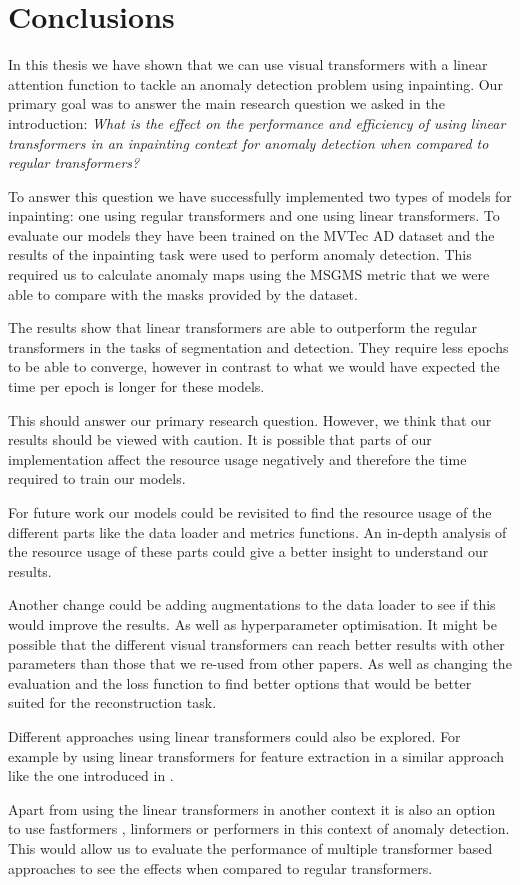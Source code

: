 \chapter{Conclusions}\label{ch:conclusions}

In this thesis we have shown that we can use visual transformers with a linear attention function to tackle an anomaly detection problem using inpainting. Our primary goal was to answer the main research question we asked in the introduction: \textsl{What is the effect on the performance and efficiency of using linear transformers in an inpainting context for anomaly detection when compared to regular transformers?}

To answer this question we have successfully implemented two types of models for inpainting: one using regular transformers and one using linear transformers. To evaluate our models they have been trained on the MVTec AD dataset and the results of the inpainting task were used to perform anomaly detection. This required us to calculate anomaly maps using the MSGMS metric that we were able to compare with the masks provided by the dataset.

The results show that linear transformers are able to outperform the regular transformers in the tasks of segmentation and detection. They require less epochs to be able to converge, however in contrast to what we would have expected the time per epoch is longer for these models.

This should answer our primary research question. However, we think that our results should be viewed with caution. It is possible that parts of our implementation affect the resource usage negatively and therefore the time required to train our models.

For future work our models could be revisited to find the resource usage of the different parts like the data loader and metrics functions. An in-depth analysis of the resource usage of these parts could give a better insight to understand our results.

Another change could be adding augmentations to the data loader to see if this would improve the results. As well as hyperparameter optimisation. It might be possible that the different visual transformers can reach better results with other parameters than those that we re-used from other papers. As well as changing the evaluation and the loss function to find better options that would be better suited for the reconstruction task.

Different approaches using linear transformers could also be explored. For example by using linear transformers for feature extraction in a similar approach like the one introduced in \cite{yu_fastflow_2021}.

Apart from using the linear transformers in another context it is also an option to use fastformers \cite{wu_fastformer_2021}, linformers \cite{wang_linformer_2020} or performers \cite{choromanski_rethinking_2020} in this context of anomaly detection. This would allow us to evaluate the performance of multiple transformer based approaches to see the effects when compared to regular transformers.